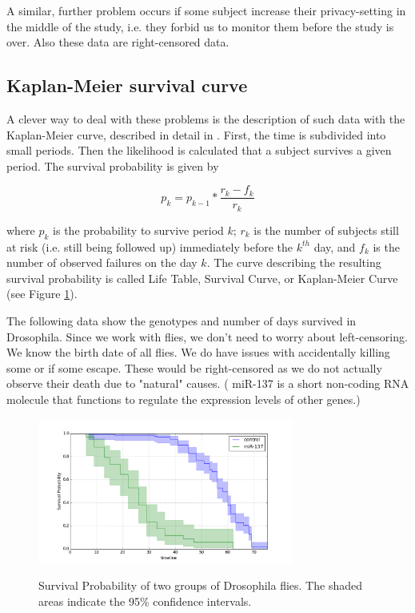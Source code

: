 A similar, further problem occurs if some subject increase their privacy-setting in the middle of the study, i.e. they forbid us to monitor them before the study is over. Also these data are right-censored data.

\subsection{Kaplan-Meier survival curve} 

A clever way to deal with these problems is the description of such data with the Kaplan-Meier curve, described in detail in \cite{altman99}. First, the time is subdivided into small periods. Then the likelihood is calculated that a subject survives a given period. The survival probability is given by

\begin{equation}
  p_k = p_{k-1} * \frac{r_k-f_k}{r_k}
\end{equation}

where $p_k$ is the probability to survive period $k$; $r_k$ is the number of subjects still at risk (i.e. still being followed up) immediately before the $k^{th}$ day, and $f_k$ is the number of observed failures on the day $k$. The curve describing the resulting survival probability is called Life Table, Survival Curve, or Kaplan-Meier Curve (see Figure \ref{fig:SurvivalCurve}).

The following data show the genotypes and number of days survived in Drosophila. Since we work with flies, we don't need to worry about left-censoring. We know the birth date of all flies. We do have issues with accidentally killing some or if some escape. These would be right-censored as we do not actually observe their death due to "natural" causes. ( miR-137 is a short non-coding RNA molecule that functions to regulate the expression levels of other genes.)




\begin{figure}
  \centering
  \includegraphics[width=0.75\textwidth]{../Images/lifelines_survival.png}\\
  \caption{Survival Probability of two groups of Drosophila flies. The shaded areas indicate the 95\% confidence intervals.}\label{fig:SurvivalCurve}
\end{figure}

